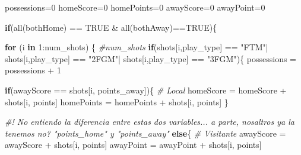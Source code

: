 \documentclass[
]{article}
\newenvironment{Shaded}{\begin{snugshade}}{\end{snugshade}}
\newcommand{\CommentTok}[1]{\textcolor[rgb]{0.56,0.35,0.01}{\textit{#1}}}
\newcommand{\ConstantTok}[1]{\textcolor[rgb]{0.00,0.00,0.00}{#1}}
\newcommand{\ControlFlowTok}[1]{\textcolor[rgb]{0.13,0.29,0.53}{\textbf{#1}}}
\newcommand{\DecValTok}[1]{\textcolor[rgb]{0.00,0.00,0.81}{#1}}
\newcommand{\FunctionTok}[1]{\textcolor[rgb]{0.00,0.00,0.00}{#1}}
\newcommand{\NormalTok}[1]{#1}
\newcommand{\OtherTok}[1]{\textcolor[rgb]{0.56,0.35,0.01}{#1}}
\newcommand{\SpecialCharTok}[1]{\textcolor[rgb]{0.00,0.00,0.00}{#1}}
\newcommand{\StringTok}[1]{\textcolor[rgb]{0.31,0.60,0.02}{#1}}
\begin{document}
\begin{Shaded}
\begin{Highlighting}[]
\NormalTok{possessions}\OtherTok{=}\DecValTok{0}
\NormalTok{homeScore}\OtherTok{=}\DecValTok{0}
\NormalTok{homePoints}\OtherTok{=}\DecValTok{0}
\NormalTok{awayScore}\OtherTok{=}\DecValTok{0}
\NormalTok{awayPoint}\OtherTok{=}\DecValTok{0}

\ControlFlowTok{if}\NormalTok{(}\FunctionTok{all}\NormalTok{(bothHome) }\SpecialCharTok{==} \ConstantTok{TRUE} \SpecialCharTok{\&} \FunctionTok{all}\NormalTok{(bothAway)}\SpecialCharTok{==}\ConstantTok{TRUE}\NormalTok{)\{}
  
  \ControlFlowTok{for}\NormalTok{ (i }\ControlFlowTok{in} \DecValTok{1}\SpecialCharTok{:}\NormalTok{num\_shots) \{ }\CommentTok{\#num\_shots}
  \ControlFlowTok{if}\NormalTok{(shots[i,}\StringTok{\textquotesingle{}play\_type\textquotesingle{}}\NormalTok{] }\SpecialCharTok{==} \StringTok{"FTM"}\SpecialCharTok{|}\NormalTok{ shots[i,}\StringTok{\textquotesingle{}play\_type\textquotesingle{}}\NormalTok{] }\SpecialCharTok{==} \StringTok{"2FGM"}\SpecialCharTok{|}\NormalTok{ shots[i,}\StringTok{\textquotesingle{}play\_type\textquotesingle{}}\NormalTok{] }\SpecialCharTok{==} \StringTok{"3FGM"}\NormalTok{)\{}
\NormalTok{    possessions }\OtherTok{=}\NormalTok{ possessions }\SpecialCharTok{+} \DecValTok{1}
    
    \ControlFlowTok{if}\NormalTok{(awayScore }\SpecialCharTok{==}\NormalTok{ shots[i, }\StringTok{\textquotesingle{}points\_away\textquotesingle{}}\NormalTok{])\{}
      \CommentTok{\# Local }
\NormalTok{      homeScore }\OtherTok{=}\NormalTok{ homeScore }\SpecialCharTok{+}\NormalTok{ shots[i, }\StringTok{\textquotesingle{}points\textquotesingle{}}\NormalTok{]}
\NormalTok{      homePoints }\OtherTok{=}\NormalTok{ homePoints }\SpecialCharTok{+}\NormalTok{ shots[i, }\StringTok{\textquotesingle{}points\textquotesingle{}}\NormalTok{]}
\NormalTok{    \}}
    
\CommentTok{\#! No entiendo la diferencia entre estas dos variables... a parte, nosaltros ya la tenemos no? "points\_home" y "points\_away"}
    \ControlFlowTok{else}\NormalTok{\{}
      \CommentTok{\# Visitante}
\NormalTok{      awayScore }\OtherTok{=}\NormalTok{ awayScore }\SpecialCharTok{+}\NormalTok{ shots[i, }\StringTok{\textquotesingle{}points\textquotesingle{}}\NormalTok{]}
\NormalTok{      awayPoint }\OtherTok{=}\NormalTok{ awayPoint }\SpecialCharTok{+}\NormalTok{ shots[i, }\StringTok{\textquotesingle{}points\textquotesingle{}}\NormalTok{]}
      

\end{Highlighting}
\end{Shaded}
\end{document}
